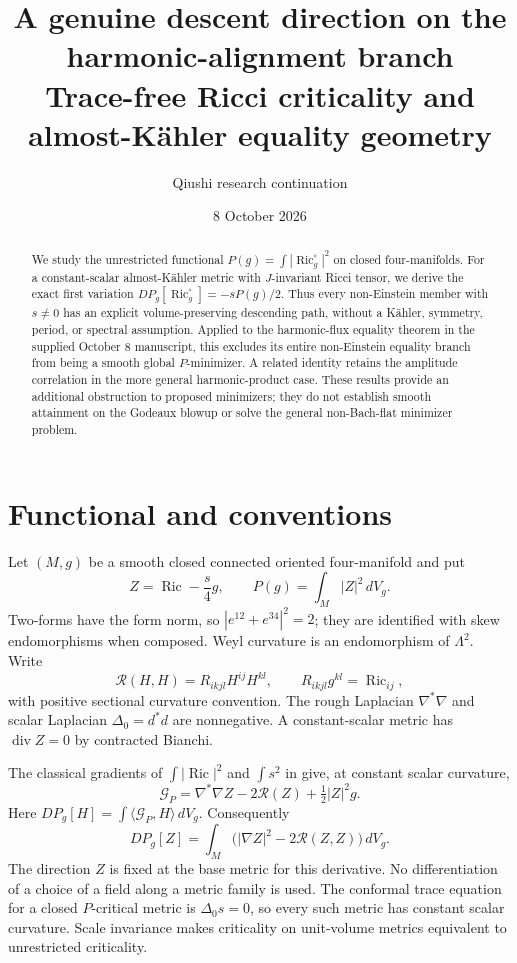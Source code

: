 \documentclass[11pt,a4paper]{article}
\title{A genuine descent direction on the harmonic-alignment branch\\[3pt]
\large Trace-free Ricci criticality and almost-K\"ahler equality geometry}
\author{Qiushi research continuation}
\date{8 October 2026}
\theoremstyle{remark}\newtheorem{remark}[theorem]{Remark}
\newcommand{\Ric}{\operatorname{Ric}}
\newcommand{\diver}{\operatorname{div}}
\newcommand{\ip}[2]{\langle #1,#2\rangle}
\numberwithin{equation}{section}
\begin{document}
\maketitle
\begin{abstract}
We study the unrestricted functional $P(g)=\int|\Ric_g^\circ|^2$ on closed
four-manifolds. For a constant-scalar almost-K\"ahler metric with
$J$-invariant Ricci tensor, we derive the exact first variation
$DP_g[\Ric_g^\circ]=-sP(g)/2$. Thus every non-Einstein member with
$s\ne0$ has an explicit volume-preserving descending path, without a
K\"ahler, symmetry, period, or spectral assumption. Applied to the
harmonic-flux equality theorem in the supplied October 8 manuscript,
this excludes its entire non-Einstein equality branch from being a
smooth global $P$-minimizer. A related identity retains the amplitude
correlation in the more general harmonic-product case. These results
provide an additional obstruction to proposed minimizers; they do not
establish smooth attainment on the Godeaux blowup or solve the general
non-Bach-flat minimizer problem.
\end{abstract}

\section{Functional and conventions}
Let $(M,g)$ be a smooth closed connected oriented four-manifold and put
\[
 Z=\Ric-\frac{s}{4}g,\qquad P(g)=\int_M|Z|^2\,dV_g.
\]
Two-forms have the form norm, so $|e^{12}+e^{34}|^2=2$; they are
identified with skew endomorphisms when composed. Weyl curvature is an
endomorphism of $\Lambda^2$. Write
\[
 \mathscr R(H,H)=R_{ikjl}H^{ij}H^{kl},\qquad
 R_{ikjl}g^{kl}=\Ric_{ij},
\]
with positive sectional curvature convention. The rough Laplacian
$\nabla^*\nabla$ and scalar Laplacian $\Delta_0=d^*d$ are nonnegative.
A constant-scalar metric has $\diver Z=0$ by contracted Bianchi.

The classical gradients of $\int|\Ric|^2$ and $\int s^2$ in
\cite[(2.5), (2.9)]{GV} give, at constant scalar curvature,
\begin{equation}\label{eq:gradient}
 \mathcal G_P=\nabla^*\nabla Z-2\mathscr R(Z)+\tfrac12|Z|^2g.
\end{equation}
Here $DP_g[H]=\int\ip{\mathcal G_P}{H}\,dV_g$. Consequently
\begin{equation}\label{eq:variation}
 DP_g[Z]=\int_M\bigl(|\nabla Z|^2-2\mathscr R(Z,Z)\bigr)\,dV_g.
\end{equation}
The direction $Z$ is fixed at the base metric for this derivative.
No differentiation of a choice of a field along a metric family is used.
The conformal trace equation for a closed $P$-critical metric is
$\Delta_0s=0$, so every such metric has constant scalar curvature.
Scale invariance makes criticality on unit-volume metrics equivalent
to unrestricted criticality.
\end{document}
